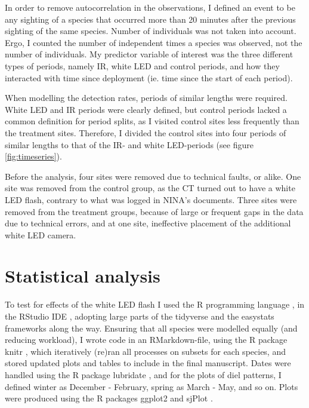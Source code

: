 In order to remove autocorrelation in the observations, I defined an event to be any sighting of a species that occurred more than 20 minutes after the previous sighting of the same species.
Number of individuals was not taken into account.
Ergo, I counted the number of independent times a species was observed, not the number of individuals.
My predictor variable of interest was the three different types of periods, namely IR, white LED and control periods, and how they interacted with time since deployment (ie. time since the start of each period).


When modelling the detection rates, periods of similar lengths were required. %
White LED and IR periods were clearly defined, but control periods lacked a common definition for period splits, as I visited control sites less frequently than the treatment sites.
Therefore, I divided the control sites into four periods of similar lengths to that of the IR- and white LED-periods (see figure \ref{fig:timeseries}). 


Before the analysis, four sites were removed due to technical faults, or alike.
One site was removed from the control group, as the CT turned out to have a white LED flash, contrary to what was logged in NINA's documents.
Three sites were removed from the treatment groups, because of large or frequent gaps in the data due to technical errors, and at one site, ineffective placement of the additional white LED camera. 






\section{Statistical analysis} 

To test for effects of the white LED flash I used the R programming language \autocite{R-base}, in the RStudio IDE \autocite{RStudio}, adopting large parts of the tidyverse \autocite{tidyverse} and the easystats \autocite{easystats} frameworks along the way. 
Ensuring that all species were modelled equally (and reducing workload), I wrote code in an RMarkdown-file, using the R package knitr \cite{knitr2015}, which iteratively (re)ran all processes on subsets for each species, and stored updated plots and tables to include in the final manuscript. 
Dates were handled using the R package lubridate \autocite{R-lubridate}, and for the plots of diel patterns, I defined winter as December - February, spring as March - May, and so on. 
Plots were produced using the R packages ggplot2 \autocite{ggplot2} and sjPlot \autocite{R-sjPlot}.


